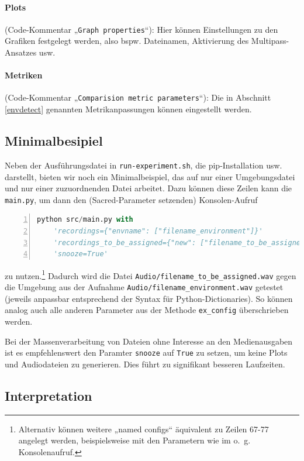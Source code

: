 \documentclass[
	fontsize=10.5pt,
	marginpar=false,
	ngerman,
	accentcolor=3d
	]{tudapub}
\begin{document}
\paragraph{Plots} (Code-Kommentar „\texttt{Graph properties}“): Hier können Einstellungen zu den Grafiken festgelegt werden, also bspw. Dateinamen, Aktivierung des Multipass-Ansatzes usw.

\paragraph{Metriken} (Code-Kommentar „\texttt{Comparision metric parameters}“): Die in Abschnitt \ref{envdetect} genannten Metrikanpassungen können eingestellt werden.

\subsection{Minimalbesipiel}
Neben der Ausführungsdatei in \texttt{run-experiment.sh}, die pip-Installation usw. darstellt, bieten wir noch ein Minimalbeispiel, das auf nur einer Umgebungsdatei und nur einer zuzuordnenden Datei arbeitet.
Dazu können diese Zeilen kann die \texttt{main.py}, um dann den (Sacred-Parameter setzenden) Konsolen-Aufruf
\begin{lstlisting}[numbers=left,stepnumber=5,firstnumber=1,numberfirstline=true,showstringspaces=false,language=Python]
python src/main.py with
	'recordings={"envname": ["filename_environment"]}'
	'recordings_to_be_assigned={"new": ["filename_to_be_assigned"]}'
	'snooze=True'
\end{lstlisting}
zu nutzen.\footnote{Alternativ können weitere „named configs“ äquivalent zu Zeilen 67-77 angelegt werden, beispielsweise mit den Parametern wie im o.~g. Konsolenaufruf.
}
Dadurch wird die Datei \texttt{Audio/filename\_to\_be\_assigned.wav} gegen die Umgebung aus der Aufnahme \texttt{Audio/filename\_environment.wav} getestet (jeweils anpassbar entsprechend der Syntax für Python-Dictionaries). So können analog auch alle anderen Parameter aus der Methode \texttt{ex\_config} überschrieben werden.

Bei der Massenverarbeitung von Dateien ohne Interesse an den Medienausgaben ist es empfehlenswert den Paramter \texttt{snooze} auf \texttt{True} zu setzen, um keine Plots und Audiodateien zu generieren. Dies führt zu signifikant besseren Laufzeiten.

\subsection{Interpretation} 
\end{document}
